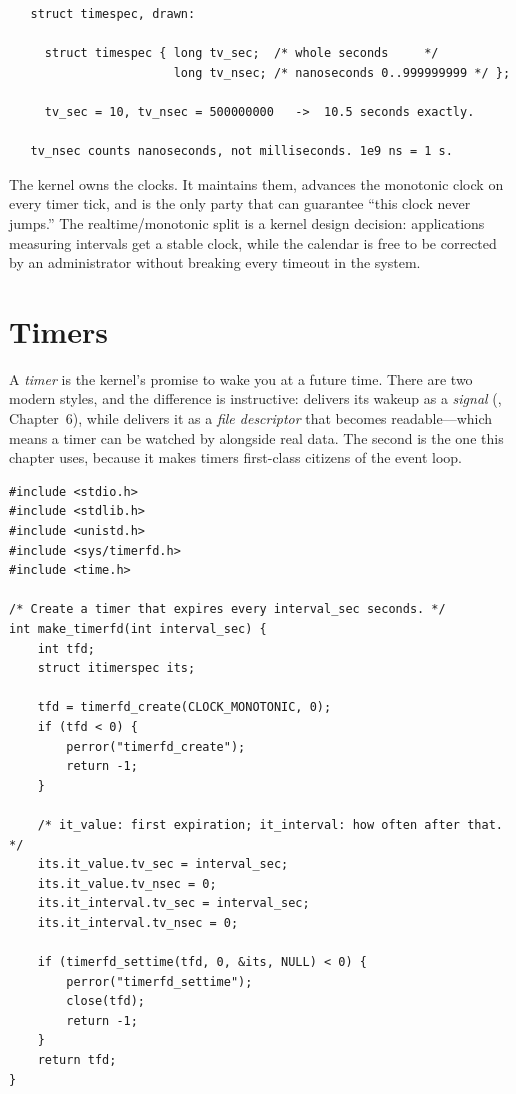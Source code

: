 \begin{verbatim}
   struct timespec, drawn:

     struct timespec { long tv_sec;  /* whole seconds     */
                       long tv_nsec; /* nanoseconds 0..999999999 */ };

     tv_sec = 10, tv_nsec = 500000000   ->  10.5 seconds exactly.

   tv_nsec counts nanoseconds, not milliseconds. 1e9 ns = 1 s.
\end{verbatim}

\begin{osconcept}
The kernel owns the clocks. It maintains them, advances the monotonic
clock on every timer tick, and is the only party that can guarantee
``this clock never jumps.'' The realtime/monotonic split is a kernel
design decision: applications measuring intervals get a stable clock,
while the calendar is free to be corrected by an administrator without
breaking every timeout in the system.
\end{osconcept}

\section{Timers}

A \emph{timer} is the kernel's promise to wake you at a future time.
There are two modern styles, and the difference is instructive:
 delivers its wakeup as a \emph{signal}
(, Chapter~6), while  delivers it as a
\emph{file descriptor} that becomes readable---which means a timer can
be watched by  alongside real data. The second is the one
this chapter uses, because it makes timers first-class citizens of the
event loop.

\begin{lstlisting}[caption={A periodic timer as a file descriptor.}]
#include <stdio.h>
#include <stdlib.h>
#include <unistd.h>
#include <sys/timerfd.h>
#include <time.h>

/* Create a timer that expires every interval_sec seconds. */
int make_timerfd(int interval_sec) {
    int tfd;
    struct itimerspec its;

    tfd = timerfd_create(CLOCK_MONOTONIC, 0);
    if (tfd < 0) {
        perror("timerfd_create");
        return -1;
    }

    /* it_value: first expiration; it_interval: how often after that. */
    its.it_value.tv_sec = interval_sec;
    its.it_value.tv_nsec = 0;
    its.it_interval.tv_sec = interval_sec;
    its.it_interval.tv_nsec = 0;

    if (timerfd_settime(tfd, 0, &its, NULL) < 0) {
        perror("timerfd_settime");
        close(tfd);
        return -1;
    }
    return tfd;
}
\end{lstlisting}

